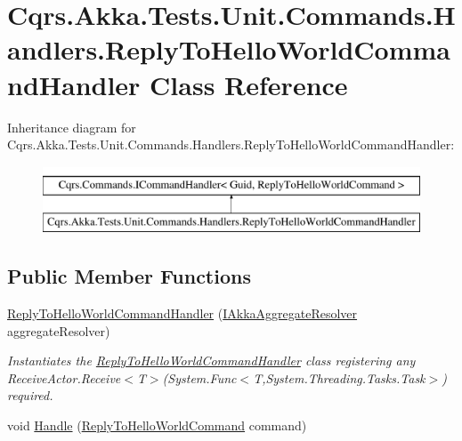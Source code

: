 \hypertarget{classCqrs_1_1Akka_1_1Tests_1_1Unit_1_1Commands_1_1Handlers_1_1ReplyToHelloWorldCommandHandler}{}\section{Cqrs.\+Akka.\+Tests.\+Unit.\+Commands.\+Handlers.\+Reply\+To\+Hello\+World\+Command\+Handler Class Reference}
\label{classCqrs_1_1Akka_1_1Tests_1_1Unit_1_1Commands_1_1Handlers_1_1ReplyToHelloWorldCommandHandler}
Inheritance diagram for Cqrs.\+Akka.\+Tests.\+Unit.\+Commands.\+Handlers.\+Reply\+To\+Hello\+World\+Command\+Handler\+:\begin{figure}[H]
\begin{center}
\leavevmode
\includegraphics[height=2.000000cm]{classCqrs_1_1Akka_1_1Tests_1_1Unit_1_1Commands_1_1Handlers_1_1ReplyToHelloWorldCommandHandler}
\end{center}
\end{figure}
\subsection*{Public Member Functions}
\begin{DoxyCompactItemize}
\item 
\hyperlink{classCqrs_1_1Akka_1_1Tests_1_1Unit_1_1Commands_1_1Handlers_1_1ReplyToHelloWorldCommandHandler_ac3c6ef2299fded8533f7e013e6cf763d}{Reply\+To\+Hello\+World\+Command\+Handler} (\hyperlink{interfaceCqrs_1_1Akka_1_1Domain_1_1IAkkaAggregateResolver}{I\+Akka\+Aggregate\+Resolver} aggregate\+Resolver)
\begin{DoxyCompactList}\small\item\em Instantiates the \hyperlink{classCqrs_1_1Akka_1_1Tests_1_1Unit_1_1Commands_1_1Handlers_1_1ReplyToHelloWorldCommandHandler}{Reply\+To\+Hello\+World\+Command\+Handler} class registering any Receive\+Actor.\+Receive$<$\+T$>$(\+System.\+Func$<$\+T,\+System.\+Threading.\+Tasks.\+Task$>$) required. \end{DoxyCompactList}\item 
void \hyperlink{classCqrs_1_1Akka_1_1Tests_1_1Unit_1_1Commands_1_1Handlers_1_1ReplyToHelloWorldCommandHandler_a647273b7056fc79b8b34b78981f6f193}{Handle} (\hyperlink{classCqrs_1_1Akka_1_1Tests_1_1Unit_1_1Commands_1_1ReplyToHelloWorldCommand}{Reply\+To\+Hello\+World\+Command} command)
\end{DoxyCompactItemize}
